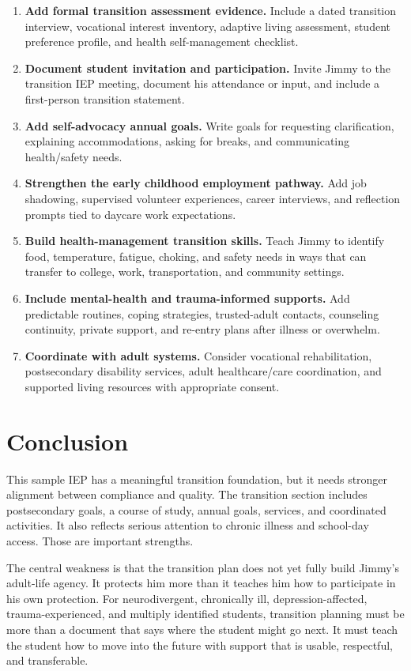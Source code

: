 \documentclass[11pt]{article}
\begin{document}
\begin{enumerate}
  \item \textbf{Add formal transition assessment evidence.} Include a dated transition interview, vocational interest inventory, adaptive living assessment, student preference profile, and health self-management checklist.
  \item \textbf{Document student invitation and participation.} Invite Jimmy to the transition IEP meeting, document his attendance or input, and include a first-person transition statement.
  \item \textbf{Add self-advocacy annual goals.} Write goals for requesting clarification, explaining accommodations, asking for breaks, and communicating health/safety needs.
  \item \textbf{Strengthen the early childhood employment pathway.} Add job shadowing, supervised volunteer experiences, career interviews, and reflection prompts tied to daycare work expectations.
  \item \textbf{Build health-management transition skills.} Teach Jimmy to identify food, temperature, fatigue, choking, and safety needs in ways that can transfer to college, work, transportation, and community settings.
  \item \textbf{Include mental-health and trauma-informed supports.} Add predictable routines, coping strategies, trusted-adult contacts, counseling continuity, private support, and re-entry plans after illness or overwhelm.
  \item \textbf{Coordinate with adult systems.} Consider vocational rehabilitation, postsecondary disability services, adult healthcare/care coordination, and supported living resources with appropriate consent.
\end{enumerate}

\section{Conclusion}

This sample IEP has a meaningful transition foundation, but it needs stronger alignment between compliance and quality. The transition section includes postsecondary goals, a course of study, annual goals, services, and coordinated activities. It also reflects serious attention to chronic illness and school-day access. Those are important strengths.

The central weakness is that the transition plan does not yet fully build Jimmy's adult-life agency. It protects him more than it teaches him how to participate in his own protection. For neurodivergent, chronically ill, depression-affected, trauma-experienced, and multiply identified students, transition planning must be more than a document that says where the student might go next. It must teach the student how to move into the future with support that is usable, respectful, and transferable.
\end{document}
